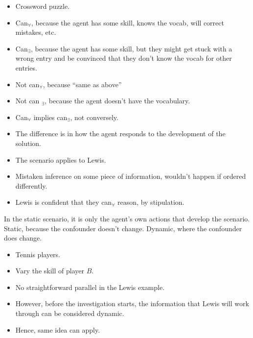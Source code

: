 \documentclass[10pt]{article}
\begin{document}
\begin{scenario}
  \begin{itemize}
  \item Crossword puzzle.
  \item Can\(_{\forall}\), because the agent has some skill, knows the vocab, will correct mistakes, etc.
  \item Can\(_{\exists}\), because the agent has some skill, but they might get stuck with a wrong entry and be convinced that they don't know the vocab for other entries.
  \item Not can\(_{\forall}\), because ``same as above''
  \item Not can \(_{\exists}\), because the agent doesn't have the vocabulary.
  \end{itemize}
  \begin{itemize}
  \item Can\(_{\forall}\) implies can\(_{\exists}\), not conversely.
  \item The difference is in how the agent responds to the development of the solution.
  \end{itemize}
\end{scenario}

\begin{itemize}
\item The scenario applies to Lewis.
\item Mistaken inference on some piece of information, wouldn't happen if ordered differently.
\item Lewis is confident that they can\(_{\forall}\) reason, by stipulation.
\end{itemize}

In the static scenario, it is only the agent's own actions that develop the scenario.
Static, because the confounder doesn't change.
Dynamic, where the confounder does change.

\begin{scenario}[Dynamic]
  \begin{itemize}
  \item Tennis players.
  \item Vary the skill of player \(B\).
  \end{itemize}
\end{scenario}

\begin{itemize}
\item No straightforward parallel in the Lewis example.
\item However, before the investigation starts, the information that Lewis will work through can be considered dynamic.
\item Hence, same idea can apply.
\end{itemize}
\end{document}

